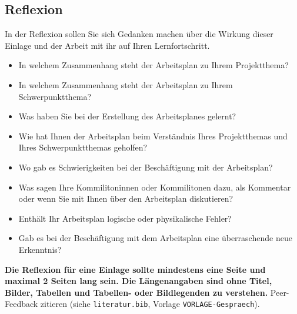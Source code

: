 \subsection{Reflexion}
\begin{hinweise}
In der Reflexion sollen Sie sich Gedanken machen über die Wirkung dieser Einlage und der Arbeit mit ihr auf
Ihren Lernfortschritt.
\begin{itemize}\itemsep0pt
\item In welchem Zusammenhang steht der Arbeitsplan zu Ihrem Projektthema?
\item In welchem Zusammenhang steht der Arbeitsplan zu Ihrem Schwerpunktthema?
\item Was haben Sie bei der Erstellung des Arbeitsplanes gelernt?
\item Wie hat Ihnen der Arbeitsplan beim Verständnis Ihres Projektthemas und Ihres Schwerpunktthemas geholfen?
\item Wo gab es Schwierigkeiten bei der Beschäftigung mit der Arbeitsplan?
\item Was sagen Ihre Kommilitoninnen oder Kommilitonen dazu, als Kommentar oder wenn Sie mit Ihnen über den Arbeitsplan diskutieren?
\item Enthält Ihr Arbeitsplan logische oder physikalische Fehler?
\item Gab es bei der Beschäftigung mit dem Arbeitsplan eine überraschende neue Erkenntnis?
\end{itemize}
\textbf{Die Reflexion für eine Einlage sollte mindestens eine Seite und maximal 2 Seiten lang sein. Die
Längenangaben sind ohne Titel, Bilder, Tabellen und Tabellen- oder Bildlegenden zu verstehen.}
Peer-Feedback zitieren (siehe \texttt{literatur.bib}, Vorlage \texttt{VORLAGE-Gespraech}).


\end{hinweise}
